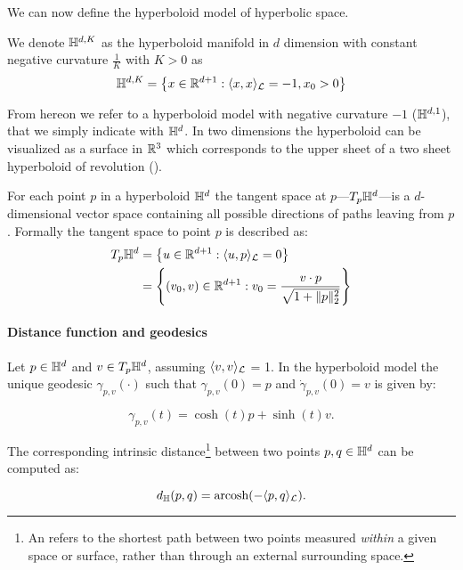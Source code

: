 We can now define the hyperboloid model of hyperbolic space.
\begin{definition}
    We denote $\mathbb{H}^{d,K}$ as the hyperboloid manifold in $d$ dimension with constant negative curvature $\frac{1}{K}$ with $K>0$ as
    \begin{equation*}
        \mathbb{H}^{d,K} = \left\{x \in \mathbb{R}^{d+1} : \langle x, x \rangle_{\mathcal{L}} = -1, x_0 > 0\right\}
    \end{equation*}
\end{definition}

From hereon we refer to a hyperboloid model with negative curvature $-1$ ($\mathbb{H}^{d,1}$), that we simply indicate with $\mathbb{H}^d$. In two dimensions the hyperboloid can be visualized as a surface in $\mathbb{R}^3$ which corresponds to the upper sheet of a two sheet hyperboloid of revolution ().



For each point $p$ in a hyperboloid $\mathbb{H}^d$ the tangent space at $p$---$T_p\mathbb{H}^d$---is a $d$-dimensional vector space containing all possible directions of paths leaving from $p$. Formally the tangent space to point $p$ is described as:
\begin{align*}
    T_p\mathbb{H}^d 
    &= \left\{u\in \mathbb{R}^{d+1} : \langle u, p \rangle_{\mathcal{L}} = 0\right\} \\
    &= \left\{(v_0,v) \in \mathbb{R}^{d+1} : v_0 = \frac{v \cdot p}{\sqrt{1 + \|p\|^2_2}}\right\}
\end{align*}

\paragraph{Distance function and geodesics}
Let $p\in\mathbb{H}^d$ and $v\in T_p\mathbb{H}^d$, assuming $\langle v,v\rangle_{\mathcal{L}} $ = 1. In the hyperboloid model the unique geodesic $\gamma_{p,v}(\cdot)$ such that $\gamma_{p,v}(0)=p$ and $\dot{\gamma}_{p,v}(0)=v$ is given by:

\begin{equation*}
    \gamma_{p,v}(t) = \cosh(t)p + \sinh(t)v.
\end{equation*}

The corresponding intrinsic distance\footnote{An  refers to the shortest path between two points measured \emph{within} a given space or surface, rather than through an external surrounding space.} between two points $p,q\in\mathbb{H}^d$ can be computed as:

\begin{equation*}
    d_{\mathbb{H}}(p, q) = \text{arcosh}(-\langle p, q \rangle_{\mathcal{L}}).
\end{equation*}

